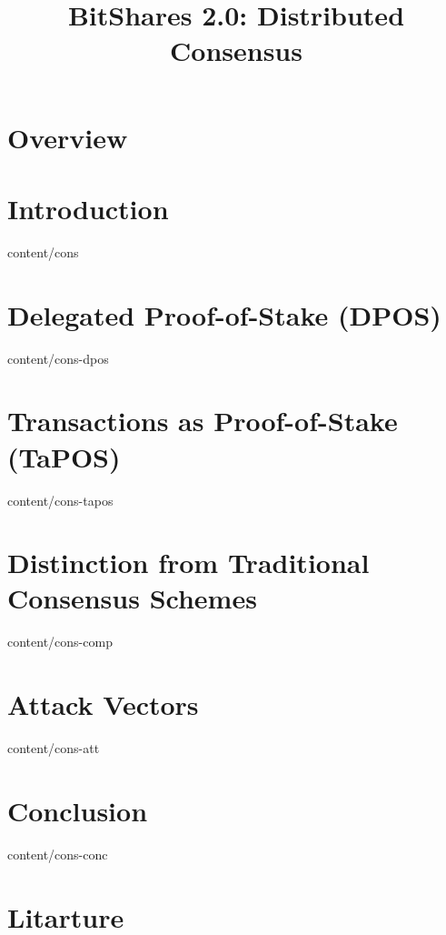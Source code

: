\documentclass[conference,final,10pt,a4paper]{IEEEtran}
\title{BitShares 2.0: Distributed Consensus}
\author{}
\begin{document}
\sloppy
\maketitle

\begin{abstract}
\end{abstract}

\section{Overview}
\section    { Introduction                                   }  { content/cons          } 
\section    { Delegated Proof-of-Stake (DPOS)                }  { content/cons-dpos     } 
\section    { Transactions as Proof-of-Stake (TaPOS)         }  { content/cons-tapos    } 
\section    { Distinction from Traditional Consensus Schemes }  { content/cons-comp     } 
\section    { Attack Vectors                                 }  { content/cons-att      } 
\section    { Conclusion                                     }  { content/cons-conc     } 
\section*   { Litarture                                      }
\end{document}
